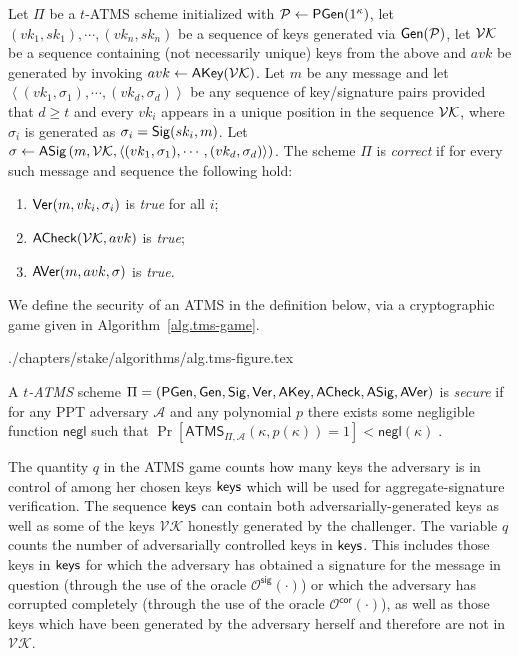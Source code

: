 \begin{definition}
  \label{def:ATMS-correctness}
  Let $\Pi$ be a $t$-ATMS scheme
  initialized with $\mathcal{P} \gets \textsf{PGen}(1^\kappa)$, let
  $(vk_1, sk_1), \cdots, (vk_n, sk_n)$
  be a sequence of keys generated via $\mathsf{Gen}(\mathcal{P})$, let $\mathcal{VK}$ be a sequence
  containing (not necessarily unique) keys from the above and $avk$ be generated
  by invoking $avk \gets \textsf{AKey}(\mathcal{VK})$. Let $m$ be any message and let
  $\left<(vk_1, \sigma_1), \cdots, (vk_d, \sigma_d)\right>$ be any sequence of key/signature pairs provided
  that $d \geq t$ and every $vk_i$ appears in a unique position in the sequence
  $\mathcal{VK}$, where $\sigma_i$ is generated as $\sigma_i = \mathsf{Sig}(sk_i, m)$.
  Let
  $\sigma
  \gets
  \textsf{ASig}\left(
    m,
    \mathcal{VK},
    \left<(vk_1, \sigma_1), \cdots, (vk_d, \sigma_d)\right>
  \right)
  $.
  The scheme $\Pi$ is
  \emph{correct} if for every such message and sequence the following hold:
  \begin{enumerate}
    \item $\mathsf{Ver}(m, vk_i, \sigma_i)$ is \emph{true} for all $i$;
    \item $\textsf{ACheck}(\mathcal{VK}, avk)$ is \emph{true};
    \item $\textsf{AVer}(m, avk, \sigma)$ is \emph{true}.
  \end{enumerate}
\end{definition}

We define the security of an ATMS
in the definition below,
via a cryptographic game given in Algorithm~\ref{alg.tms-game}.

{./chapters/stake/algorithms/alg.tms-figure.tex}

\begin{definition}[Security]
  \label{def:ATMS-security}
  A \textit{$t$-ATMS} scheme
  $\Pi = (
    \textsf{PGen},
    \mathsf{Gen},
    \mathsf{Sig},
    \mathsf{Ver},
    \textsf{AKey},
    \textsf{ACheck},
    \textsf{ASig},
    \textsf{AVer}
  )$
  is \emph{secure} if for any PPT adversary $\mathcal{A}$ and any polynomial $p$
  there exists some negligible function $\textsf{negl}$ such that
  $
    \Pr[ \textsf{ATMS}_{\Pi, \mathcal{A}}(\kappa, p(\kappa)) = 1]
    < \textsf{negl}(\kappa)
    \; .
  $
\end{definition}

The quantity $q$ in the ATMS game counts how many keys the adversary is in
control of among her chosen keys $\textsf{keys}$ which will be used for
aggregate-signature verification. The sequence $\textsf{keys}$ can contain both
adversarially-generated keys as well as some of the keys $\mathcal{VK}$
honestly generated by the challenger. The variable $q$ counts the number of
adversarially controlled keys in $\textsf{keys}$. This includes those keys in
$\textsf{keys}$ for which the adversary has obtained a signature for the message in
question (through the use of the oracle $\mathcal{O}^\mathsf{sig}(\cdot)$) or which the
adversary has corrupted completely (through the use of the oracle
$\mathcal{O}^\mathsf{cor}(\cdot)$), as well as those keys which have been generated by
the adversary herself and therefore are not in $\mathcal{VK}$.


